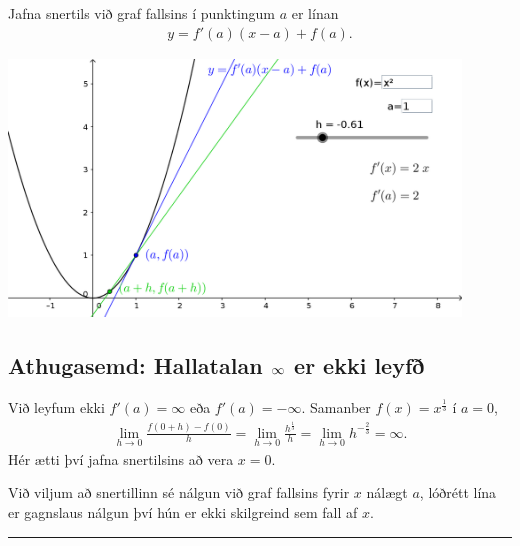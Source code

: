 \documentclass[a4paper,10pt,icelandic]{sphinxmanual}
\begin{document}
Jafna snertils við graf fallsins í punktingum \(a\) er línan
\begin{equation*}
\begin{split}y = f'(a)(x-a) + f(a).\end{split}
\end{equation*}

\begin{center}
\includegraphics[width=12cm,keepaspectratio=true]{./01_05_snertill.png}
\end{center}



\subsection{Athugasemd: Hallatalan \protect\(\infty\protect\) er ekki leyfð}
\label{kafli03:athugasemd-hallatalan-er-ekki-leyf}
Við leyfum ekki \(f'(a) = \infty\) eða
\(f'(a) = -\infty\). Samanber
\(f(x) = x^{\frac 13}\) í \(a=0\),
\begin{equation*}
\begin{split}\lim_{h \to 0} \frac{f(0+h)-f(0)}h =
     \lim_{h \to 0} \frac{h^{\frac 13}}h =
    \lim_{h \to 0} h^{-\frac 23} = \infty.\end{split}
\end{equation*}
Hér ætti því jafna snertilsins að vera \(x=0\).


Við viljum að snertillinn sé nálgun við graf fallsins fyrir \(x\) nálægt
\(a\), lóðrétt lína er gagnslaus nálgun því hún er ekki skilgreind sem
fall af \(x\).


\bigskip\hrule{}\bigskip
\end{document}
